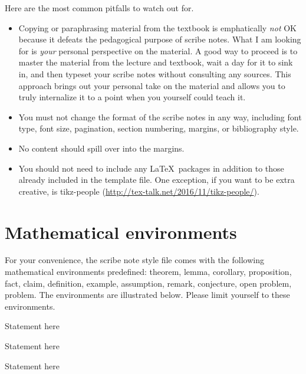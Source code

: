\documentclass[usletter]{article}
\begin{document}
Here are the most common pitfalls to watch out for.

\begin{itemize}
\item Copying or paraphrasing material from the
textbook is emphatically \emph{not} OK because it
defeats the pedagogical purpose of scribe notes.  What
I am looking for is \emph{your} personal perspective on
the material. A good way to proceed is to master the
material from the lecture and textbook, wait a day
for it to sink in, and then typeset your scribe notes
without consulting any sources. This approach brings
out your personal take on the material and allows you
to truly internalize it to a point when you yourself
could teach it.

\item You must not change the format of the scribe
notes in any way, including font type, font size,
pagination, section numbering, margins, or bibliography
style. 

\item No content should spill over into the margins. 

\item You should not need to
include any \LaTeX\ packages in addition to those
already included in the template file. 
One exception, if you want to be extra creative, is tikz-people
(\url{http://tex-talk.net/2016/11/tikz-people/}).
\end{itemize}


\section{Mathematical environments}

For your convenience, the scribe note style file comes
with the following mathematical environments
predefined: theorem, lemma, corollary, proposition,
fact, claim, definition, example, assumption, remark,
conjecture, open problem, problem. The environments are
illustrated below.  Please limit yourself to these
environments.

\begin{theorem}
Statement here 
\end{theorem}

\begin{lemma}
Statement here
\end{lemma}

\begin{corollary}
Statement here
\end{corollary}
\end{document}
